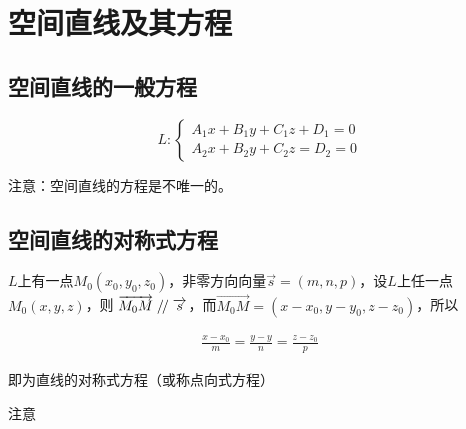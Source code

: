 \documentclass[12pt, a4paper]{article}
\numberwithin{equation}{section}
\renewcommand{\parallel}{\mathrel{/\mskip-2.5mu/}}
\begin{document}
\section{空间直线及其方程}

\subsection{空间直线的一般方程}

    \begin{equation}
        L:\left\{\begin{array}{l}
        A_1 x+B_1 y+C_1 z+D_1=0 \\
        A_2 x+B_2 y+C_2 z=D_2=0
        \end{array}\right.
    \end{equation}

    注意：空间直线的方程是不唯一的。

\subsection{空间直线的对称式方程}

    \(L\)上有一点\(M_0\left(x_0, y_0, z_0\right)\)，非零方向向量\(\overrightarrow{s} =
    \left(m, n, p\right)\)，设\(L\)上任一点\(M_0\left(x, y, z\right)\)，则
    \(\overrightarrow{M_{0}M} \parallel \overrightarrow{s}\)，而\(\overrightarrow{M_{0}M} =
    \left(x-x_0, y-y_0, z-z_0\right)\)，所以

    \begin{align}
        \frac{x-x_0}{m}=\frac{y-y}{n}=\frac{z-z_0}{p}
    \end{align}

    即为直线的对称式方程（或称点向式方程）
    
    注意
\end{document}
